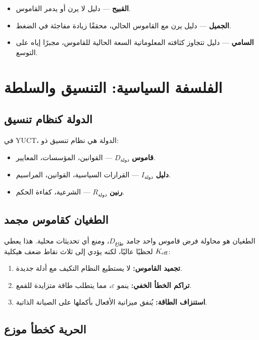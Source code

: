 \documentclass[11pt,a4paper]{article}
\newcommand{\eps}{\varepsilon}
\begin{document}
	\begin{itemize}
		\item \textbf{القبيح} — دليل لا يرن أو يدمر القاموس.
		\item \textbf{الجميل} — دليل يرن مع القاموس الحالي، محققًا زيادة مفاجئة في الضغط.
		\item \textbf{السامي} — دليل تتجاوز كثافته المعلوماتية السعة الحالية للقاموس، مجبرًا إياه على التوسع.
	\end{itemize}
	
	\section{الفلسفة السياسية: التنسيق والسلطة}
	
	\subsection{الدولة كنظام تنسيق}
	
	في YUCT، الدولة هي نظام تنسيق ذو:
	
	\begin{itemize}
		\item \textbf{قاموس} \(D_{\text{دولة}}\) — القوانين، المؤسسات، المعايير.
		\item \textbf{دليل} \(I_{\text{دولة}}\) — القرارات السياسية، القوانين، المراسيم.
		\item \textbf{رنين} \(R_{\text{دولة}}\) — الشرعية، كفاءة الحكم.
	\end{itemize}
	
	\subsection{الطغيان كقاموس مجمد}
	
	الطغيان هو محاولة فرض قاموس واحد جامد \(D_{\text{طاغ}}\)، ومنع أي تحديثات محلية. هذا يعطي \(\Keff\) لحظيًا عاليًا، لكنه يؤدي إلى ثلاث نقاط ضعف هيكلية:
	
	\begin{enumerate}
		\item \textbf{تجميد القاموس:} لا يستطيع النظام التكيف مع أدلة جديدة.
		\item \textbf{تراكم الخطأ الخفي:} ينمو \(\eps\)، مما يتطلب طاقة متزايدة للقمع.
		\item \textbf{استنزاف الطاقة:} يُنفق ميزانية الأفعال بأكملها على الصيانة الذاتية.
	\end{enumerate}
	
	\subsection{الحرية كخطأ موزع}
	
\end{document}
